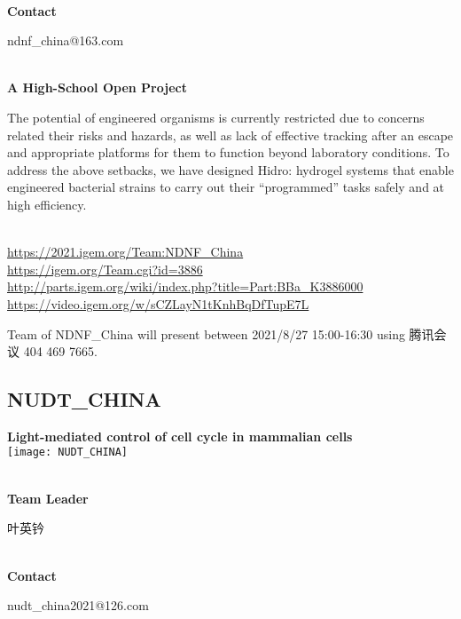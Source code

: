 \textbf{\\Contact}

  ndnf\_china@163.com


\textbf{\\A High-School Open Project\\}\begin{spacing}{1.5}

The potential of engineered organisms is currently restricted due to concerns related their risks and hazards, as well as lack of effective tracking after an escape and appropriate platforms for them to function beyond laboratory conditions. To address the above setbacks, we have designed Hidro: hydrogel systems that enable engineered bacterial strains to carry out their “programmed” tasks safely and at high efficiency.\end{spacing}
\\

\url{https://2021.igem.org/Team:NDNF\_China }\\
\url{https://igem.org/Team.cgi?id=3886 }\\
\url{http://parts.igem.org/wiki/index.php?title=Part:BBa_K3886000 }\\
\url{https://video.igem.org/w/sCZLayN1tKnhBqDfTupE7L }\\

\vfill{}









Team of NDNF\_China will present between  2021/8/27 15:00-16:30       using 腾讯会议 404 469 7665.
\newpage


\subsection{\textcolor{Blu}{ NUDT\_CHINA } }
\vspace{5mm}
\begin{center}
\large{
  \textbf{ Light-mediated control of cell cycle in mammalian cells }\\
  \texttt{[image: NUDT\_CHINA]}
}
\end{center}
\textbf{\\Team Leader}

  叶英钤


\textbf{\\Contact}

  nudt\_china2021@126.com


